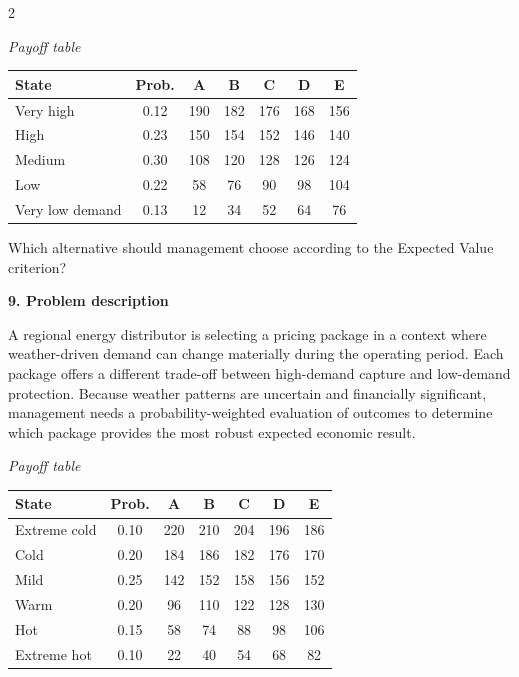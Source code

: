 \documentclass[12pt]{article}
\newcommand{\SubsectionBox}[1]{%
	\noindent\colorbox{gray!30}{%
		\parbox{\linewidth}{\textbf{#1}}%
	}\par\vspace{0.35cm}%
}
\begin{document}
\begin{multicols}{2}
				\begin{center}
					\textit{Payoff table} \par
					\begin{tabular}{l c c c c c c}
						\toprule
						State & Prob. & A & B & C & D & E \\
						\midrule
						Very high & 0.12 & 190 & 182 & 176 & 168 & 156 \\
						High & 0.23 & 150 & 154 & 152 & 146 & 140 \\
						Medium & 0.30 & 108 & 120 & 128 & 126 & 124 \\
						Low & 0.22 & 58 & 76 & 90 & 98 & 104 \\
						Very low demand & 0.13 & 12 & 34 & 52 & 64 & 76 \\
						\bottomrule
					\end{tabular}
				\end{center}
		
				Which alternative should management choose according to the Expected Value criterion?

		\vspace{0.25cm}
		\SubsectionBox{9. Problem description}\vspace{-0.25cm}
		A regional energy distributor is selecting a pricing package in a context where weather-driven demand can change materially during the operating period. Each package offers a different trade-off between high-demand capture and low-demand protection. Because weather patterns are uncertain and financially significant, management needs a probability-weighted evaluation of outcomes to determine which package provides the most robust expected economic result.
		
				\begin{center}
					\textit{Payoff table}
					\begin{tabular}{l c c c c c c}
						\toprule
						State & Prob. & A & B & C & D & E \\
						\midrule
						Extreme cold & 0.10 & 220 & 210 & 204 & 196 & 186 \\
						Cold & 0.20 & 184 & 186 & 182 & 176 & 170 \\
						Mild & 0.25 & 142 & 152 & 158 & 156 & 152 \\
						Warm & 0.20 & 96 & 110 & 122 & 128 & 130 \\
						Hot & 0.15 & 58 & 74 & 88 & 98 & 106 \\
						Extreme hot & 0.10 & 22 & 40 & 54 & 68 & 82 \\
						\bottomrule
					\end{tabular}
				\end{center}
		

\end{multicols}
\end{document}
